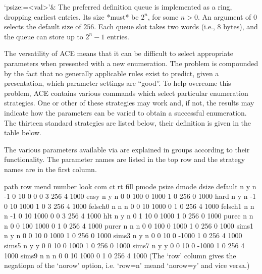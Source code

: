 `psize:=<val>'&
The preferred definition queue is implemented as a ring, dropping
  earliest entries.
Its size *must* be $2^n$, for some $n>0$.
An argument of 0 selects the default size of $256$.
Each queue slot takes two words (i.e., 8 bytes), and the queue can store
  up to $2^n-1$ entries.

\enditems


The versatility of ACE means that it can be difficult to select appropriate
parameters when presented with a new enumeration.  The problem is compounded
by the fact that no generally applicable rules exist to predict, given a
presentation, which parameter settings are ``good''.  To help overcome this
problem, ACE contains various commands which select particular enumeration
strategies.  One or other of these strategies may work and, if not, the
results may indicate how the parameters can be varied to obtain a successful
enumeration.  The thirteen standard strategies are listed below, their
definition is given in the table below.

The various parameters available via {\GAP} are explained in groups according
to their functionality. The parameter names are listed in the top row
and the strategy names are in the first column.

\begintt
       path row mend number  look com  ct   rt   fill pmode psize dmode dsize 
default n    y   n     -1     0   10   0    0      0    3    256    4    1000
easy    n    y   n      0     0   100  0    1000   1    0    256    0    1000
hard    n    y   n     -1     0   10   1000 1      0    3    256    4    1000
felsch0 n    n   n     0      0   10   1000 0      1    0    256    4    1000
felsch1 n    n   n     -1     0   10   1000 0      0    3    256    4    1000
hlt     n    y   n     0      1   10   0    1000   1    0    256    0    1000
purec   n    n   n     0      0   100  1000 0      1    0    256    4    1000
purer   n    n   n     0      0   100  0    1000   1    0    256    0    1000
sims1   n    y   n     0      0   10   0    1000   1    0    256    0    1000
sims3   n    y   n     0      0   10   0    -1000  1    0    256    4    1000
sims5   n    y   y     0      0   10   0    1000   1    0    256    0    1000
sims7   n    y   y     0      0   10   0    -1000  1    0    256    4    1000
sims9   n    n   n     0      0   10   1000 0      1    0    256    4    1000
\endtt
(The `row' column gives the negatiopn of the `norow' option, i.e. `row=n'
meand `norow=y' and vice versa.)

